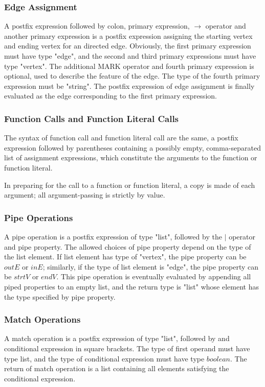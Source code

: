 \documentclass[letterpaper,12pt]{article}
\begin{document}
\subsubsection{Edge Assignment}
A postfix expression followed by colon, primary expression, $\rightarrow$ operator and another primary expression is a postfix expression assigning the starting vertex and ending vertex for an directed edge. Obviously, the first primary expression must have type "edge", and the second and third primary expressions must have type "vertex". The additional MARK operator and fourth primary expression is optional, used to describe the  feature of the edge. The type of the fourth primary expression must be "string". The postfix expression of edge assignment is finally evaluated as the edge corresponding to the first primary expression.

\subsubsection{Function Calls and Function Literal Calls}
The syntax of function call and function literal call are the same, a postfix expression followed by parentheses containing a possibly empty, comma-separated list of assignment expressions, which constitute the arguments to the function or function literal. \newline

In preparing for the call to a function or function literal, a copy is made of each argument; all argument-passing is strictly by value. 

\subsubsection{Pipe Operations}\label{sec:pipe}
A pipe operation is a postfix expression of type "list", followed by the $|$ operator and pipe property. The allowed choices of pipe property depend on the type of the list element. If list element has type of "vertex", the pipe property can be $outE$ or $inE$; similarly, if the type of list element is "edge", the pipe property can be $strtV$ or $endV$. 
This pipe operation is eventually evaluated by appending all piped properties to an empty list, and the return type is "list" whose element has the type specified by pipe property.

\subsubsection{Match Operations}\label{sec:match}
A match operation is a postfix expression of type "list", followed by and conditional expression in square brackets. The type of first operand must have type list, and the type of conditional expression must have type $boolean$. The return of match operation is a list containing all elements satisfying the conditional expression. \newline
\end{document}

